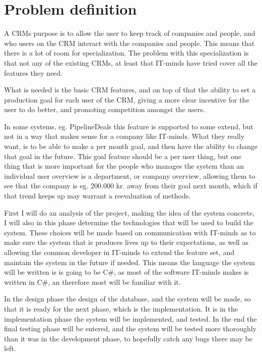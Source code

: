 \section{Problem definition}
\label{sec:Problem definition}
A CRMs purpose is to allow the user to keep track of companies and people, and who users on the CRM interact with the companies and people. This means that there is a lot of room for specialization. The problem with this specialization is that not any of the existing CRMs, at least that IT-minds have tried cover all the features they need.

What is needed is the basic CRM features, and on top of that the ability to set a production goal for each user of the CRM, giving a more clear incentive for the user to do better, and promoting competition amongst the users.

In some systems, eg. PipelineDeals\cite{pipelinedeals:features} this feature is supported to some extend, but not in a way that makes sense for a company like IT-minds. What they really want, is to be able to make a per month goal, and then have the ability to change that goal in the future. This goal feature should be a per user thing, but one thing that is more important for the people who manages the system than an individual user overview is a department, or company overview, allowing them to see that the company is eg. 200.000 kr. away from their goal next month, which if that trend keeps up may warrant a reevaluation of methods.

First I will do an analysis of the project, making the idea of the system concrete, I will also in this phase determine the technologies that will be used to build the system. These choices will be made based on communication with IT-minds as to make sure the system that is produces lives up to their expectations, as well as allowing the common developer in IT-minds to extend the feature set, and maintain the system in the future if needed. This means the language the system will be written is is going to be C\#, as most of the software IT-minds makes is written in C\#, an therefore most will be familiar with it.

In the design phase the design of the database, and the system will be made, so that it is ready for the next phase, which is the implementation. It is in the implementation phase the system will be implemented, and tested. In the end the final testing phase will be entered, and the system will be tested more thoroughly than it was in the development phase, to hopefully catch any bugs there may be left.

